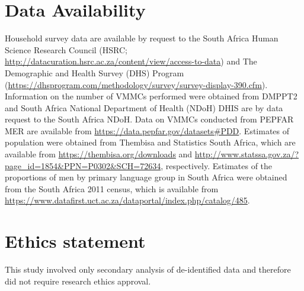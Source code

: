 \documentclass{article}
\begin{document}
\section*{Data Availability}


Household survey data are available by request to the South Africa Human Science Research Council (HSRC; \url{http://datacuration.hsrc.ac.za/content/view/access-to-data}) and The Demographic and Health Survey (DHS) Program (\url{https://dhsprogram.com/methodology/survey/survey-display-390.cfm}). Information on the number of VMMCs performed were obtained from DMPPT2 and South Africa National Department of Health (NDoH) DHIS are by data request to the South Africa NDoH. Data on VMMCs conducted from PEPFAR MER are available from \url{https://data.pepfar.gov/datasets#PDD}. Estimates of population were obtained from Thembisa and Statistics South Africa, which are available from \url{https://thembisa.org/downloads} and \url{http://www.statssa.gov.za/?page_id=1854&PPN=P0302&SCH=72634}, respectively. Estimates of the proportions of men by primary language group in South Africa were obtained from the South Africa 2011 census, which is available from \url{https://www.datafirst.uct.ac.za/dataportal/index.php/catalog/485}.


\section*{Ethics statement}


This study involved only secondary analysis of de-identified data and therefore did not require research ethics approval. 
 
\end{document}
